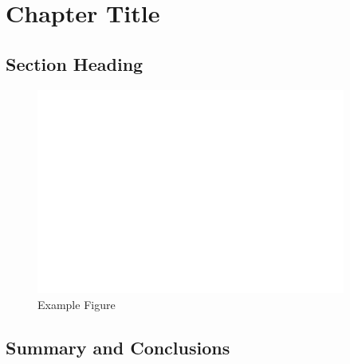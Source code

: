 \chapter{Chapter Title}



\section{Section Heading}

\begin{figure}[bth]
	\centering
	\includegraphics[width=4in]{Images/tmp.png}
	\caption{Example Figure}
	\label{Example Label}
\end{figure}


\section{Summary and Conclusions}





